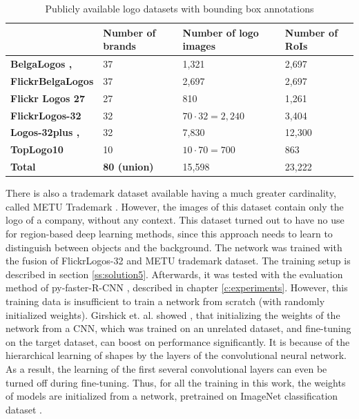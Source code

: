 \begin{table}[ht!]
\centering
\begin{tabular}{|l|l|l|l|}
\hline & \textbf{Number of brands} & \textbf{Number of logo images} & \textbf{Number of RoIs} \\
\hline
\textbf{BelgaLogos \cite{belgalogos09}, \cite{letessier2012scalable}} & 37 & 1,321 & 2,697 \\
\hline
\textbf{FlickrBelgaLogos \cite{letessier2012scalable}} & 37 & 2,697 & 2,697 \\
\hline
\textbf{Flickr Logos 27 \cite{619}} & 27 & 810 & 1,261 \\
\hline
\textbf{FlickrLogos-32 \cite{RombergICMR2011}} & 32 & $70 \cdot 32 = 2,240$ & 3,404 \\
\hline
\textbf{Logos-32plus \cite{bianco2017deep}, \cite{bianco2015logo}} & 32 & 7,830 & 12,300 \\
\hline
\textbf{TopLogo10 \cite{DBLP:journals/corr/SuZG16}} & 10 & $10 \cdot 70 = 700$ & 863 \\
\hline\hline
\textbf{Total} & \textbf{80 (union)} & 15,598 & 23,222 \\ \hline
\end{tabular}
\caption{Publicly available logo datasets with bounding box annotations}
\label{table:logodatasets}
\end{table}

There is also a trademark dataset available having a much greater cardinality, called METU Trademark \cite{DBLP:journals/corr/TursunAK17}. However, the images of this dataset contain only the logo of a company, without any context. This dataset turned out to have no use for region-based deep learning methods, since this approach needs to learn to distinguish between objects and the background. The network was trained with the fusion of FlickrLogos-32 and METU trademark dataset. The training setup is described in section \ref{ss:solution5}. Afterwards, it was tested with the evaluation method of py-faster-R-CNN \cite{Girshick2017} \cite{NIPS2015_5638}, described in chapter \ref{c:experiments}.
\bigbreak
However, this training data is insufficient to train a network from scratch (with randomly initialized weights). Girshick et. al. showed \cite{DBLP:journals/corr/GirshickDDM13}, that initializing the weights of the network from a CNN, which was trained on an unrelated dataset, and fine-tuning on the target dataset, can boost on performance significantly. It is because of the hierarchical learning of shapes by the layers of the convolutional neural network. As a result, the learning of the first several convolutional layers can even be turned off during fine-tuning. Thus, for all the training in this work, the weights of models are initialized from a network, pretrained on ImageNet classification dataset \cite{imagenet_cvpr09}.
\bigbreak
